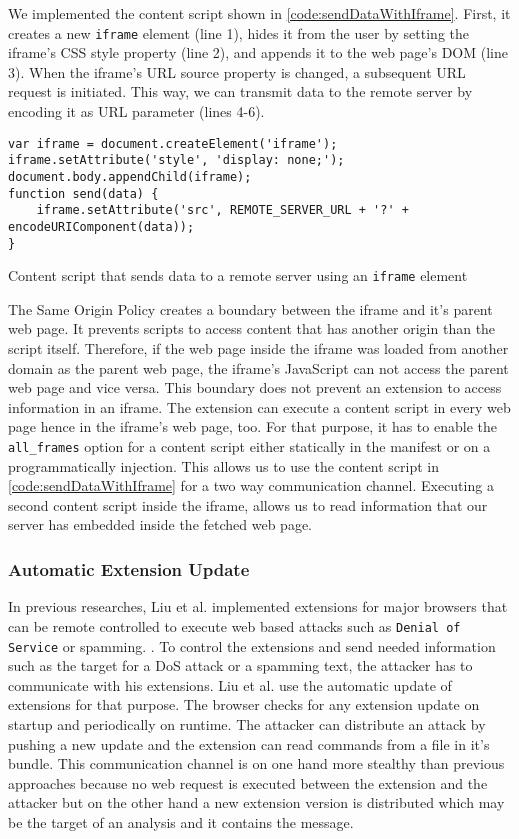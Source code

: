 	We implemented the content script shown in \autoref{code:sendDataWithIframe}. First, it creates a new \texttt{iframe} element (line 1), hides it from the user by setting the iframe's CSS style property (line 2), and appends it to the web page's DOM (line 3). When the iframe's URL source property is changed, a subsequent URL request is initiated. This way, we can transmit data to the remote server by encoding it as URL parameter (lines 4-6).
	
	\begin{code}
		\begin{lstlisting}
var iframe = document.createElement('iframe');
iframe.setAttribute('style', 'display: none;');
document.body.appendChild(iframe);
function send(data) {
	iframe.setAttribute('src', REMOTE_SERVER_URL + '?' + encodeURIComponent(data));
}
\end{lstlisting}
		\caption{Content script that sends data to a remote server using an \texttt{iframe} element}
		\label{code:sendDataWithIframe}
	\end{code}
	
	The Same Origin Policy creates a boundary between the iframe and it's parent web page. It prevents scripts to access content that has another origin than the script itself. Therefore, if the web page inside the iframe was loaded from another domain as the parent web page, the iframe's JavaScript can not access the parent web page and vice versa. This boundary does not prevent an extension to access information in an iframe. The extension can execute a content script in every web page hence in the iframe's web page, too. For that purpose, it has to enable the \texttt{all\_frames} option for a content script either statically in the manifest or on a programmatically injection. This allows us to use the content script in \autoref{code:sendDataWithIframe} for a two way communication channel. Executing a second content script inside the iframe, allows us to read information that our server has embedded inside the fetched web page. 
	
\subsubsection{Automatic Extension Update}

	In previous researches, Liu et al. implemented extensions for major browsers that can be remote controlled to execute web based attacks such as \texttt{Denial of Service} or spamming. \cite{liu2011botnet, Liu12chromeextensions:}. To control the extensions and send needed information such as the target for a DoS attack or a spamming text, the attacker has to communicate with his extensions. Liu et al. use the automatic update of extensions for that purpose. The browser checks for any extension update on startup and periodically on runtime. The attacker can distribute an attack by pushing a new update and the extension can read commands from a file in it's bundle. This communication channel is on one hand more stealthy than previous approaches because no web request is executed between the extension and the attacker but on the other hand a new extension version is distributed which may be the target of an analysis and it contains the message. 
	
